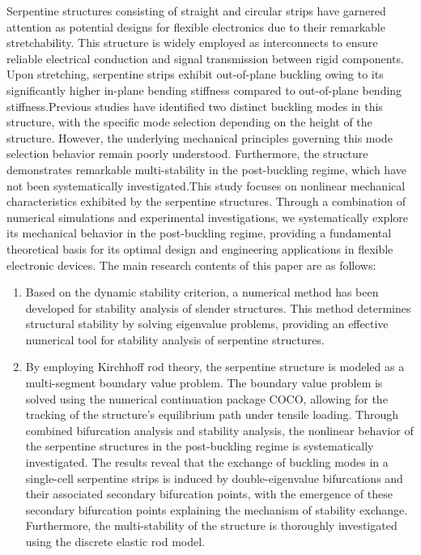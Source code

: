 \begin{abstract*}
	
Serpentine structures consisting of straight and circular strips have garnered attention as potential designs for flexible electronics due to their remarkable stretchability. This structure is widely employed as interconnects to ensure reliable electrical conduction and signal transmission between rigid components. Upon stretching, serpentine strips exhibit out-of-plane buckling owing to its significantly higher in-plane bending stiffness compared to out-of-plane bending stiffness.Previous studies have identified two distinct buckling modes in this structure, with the specific mode selection depending on the height of the structure. However, the underlying mechanical principles governing this mode selection behavior remain poorly understood. Furthermore, the structure demonstrates remarkable multi-stability in the post-buckling regime, which have not been systematically investigated.This study focuses on nonlinear mechanical characteristics exhibited by the serpentine structures. Through a combination of numerical simulations and experimental investigations, we systematically explore its mechanical behavior in the post-buckling regime, providing a fundamental theoretical basis for its optimal design and engineering applications in flexible electronic devices. The main research contents of this paper are as follows:
\begin{enumerate}
	\item Based on the dynamic stability criterion, a numerical method has been developed for stability analysis of slender structures. This method determines structural stability by solving eigenvalue problems, providing an effective numerical tool for stability analysis of serpentine structures.
	\item By employing Kirchhoff rod theory, the serpentine structure is modeled as a multi-segment boundary value problem. The boundary value problem is solved using the numerical continuation package COCO, allowing for the tracking of the structure's equilibrium path under tensile loading. Through combined bifurcation analysis and stability analysis, the nonlinear behavior of the serpentine structures in the post-buckling regime is systematically investigated. The results reveal that the exchange of buckling modes in a single-cell serpentine strips is induced by double-eigenvalue bifurcations and their associated secondary bifurcation points, with the emergence of these secondary bifurcation points explaining the mechanism of stability exchange. Furthermore, the multi-stability of the structure is thoroughly investigated using the discrete elastic rod model.

\end{enumerate}
\end{abstract*}
